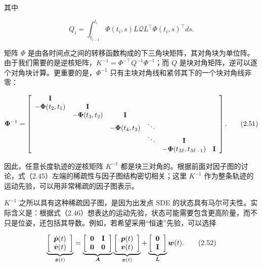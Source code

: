 其中

\begin{equation*}
Q_i=\int_{t_{i-1}}^{t_i}\Phi(t_i,s)L\mathcal{Q}L^\top\Phi(t_i,s)^\top ds.
\end{equation*}

矩阵 $\Phi$ 是由各时间点之间的转移函数构成的下三角块矩阵，其对角块为单位阵。由于我们需要的是逆核矩阵，$K^{-1}=\Phi^{-\top}Q^{-1}\Phi^{-1}$；而 $Q$ 是块对角矩阵，逆可以逐个对角块计算。更重要的是，$\Phi^{-1}$ 只有主块对角线和紧邻其下的一个块对角线非零：

\begin{equation}
\boldsymbol {\Phi} ^ {- 1} = \left[ \begin{array}{c c c c c c} \mathbf {I} & & & & & \\ - \boldsymbol {\Phi} (t _ {2}, t _ {1}) & \mathbf {I} & & & & \\ & - \boldsymbol {\Phi} (t _ {3}, t _ {2}) & \mathbf {I} & & & \\ & & - \boldsymbol {\Phi} (t _ {4}, t _ {3}) & \ddots & & \\ & & & \ddots & \mathbf {I} \\ & & & & - \boldsymbol {\Phi} (t _ {M}, t _ {M - 1}) & \mathbf {I} \end{array} \right].\tag{2.51}
\end{equation}

因此，任意长度轨迹的逆核矩阵 $K^{-1}$ 都是块三对角的。根据前面对因子图的讨论，式（2.45）左端的稀疏性与因子图结构密切相关；这里 $K^{-1}$ 作为整条轨迹的运动先验，可以用非常稀疏的因子图表示。

$K^{-1}$ 之所以具有这种稀疏因子图，是因为出发点 SDE 的状态具有马尔可夫性。实际含义是：根据式（2.46）想表达的运动先验，状态可能需要包含更高阶量，而不只是位姿，还包括其导数。例如，若希望采用“恒速”先验，可以选择

\begin{equation}
\underbrace {\left[ \begin{array}{c} \dot {\boldsymbol {p}} (t) \\ \dot {\boldsymbol {v}} (t) \end{array} \right]} _ {\dot {\boldsymbol {x}} (t)} = \underbrace {\left[ \begin{array}{c c} \mathbf {0} & \mathbf {I} \\ \mathbf {0} & \mathbf {0} \end{array} \right]} _ {\boldsymbol {A}} \underbrace {\left[ \begin{array}{c} \boldsymbol {p} (t) \\ \boldsymbol {v} (t) \end{array} \right]} _ {\boldsymbol {x} (t)} + \underbrace {\left[ \begin{array}{c} \mathbf {0} \\ \mathbf {I} \end{array} \right]} _ {\boldsymbol {L}} \boldsymbol {w} (t).\tag{2.52}
\end{equation}

